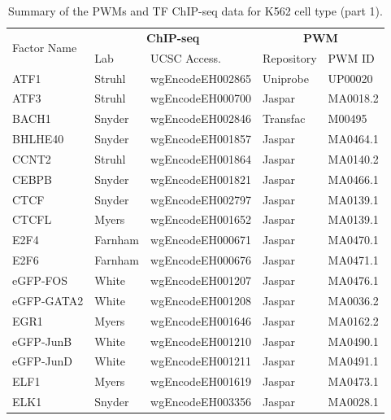 \documentclass{bioinfo}
\begin{document}
\begin{table}[t]
\begin{center}
\caption{Summary of the PWMs and TF ChIP-seq data for K562 cell type (part 1).}
\label{tab:datapwm.k562.1}
    \renewcommand{\arraystretch}{1.2}
    \begin{tabular}{ l|ll|ll }
        \hline
        \multirow{2}{*}{Factor Name} & \multicolumn{2}{c|}{\textbf{ChIP-seq}} & \multicolumn{2}{c}{\textbf{PWM}} \\
                & Lab     & UCSC Access.     & Repository & PWM ID \\
        \hline
        ATF1    & Struhl  & wgEncodeEH002865 & Uniprobe   & UP00020  \\
        ATF3    & Struhl  & wgEncodeEH000700 & Jaspar     & MA0018.2 \\
        BACH1   & Snyder  & wgEncodeEH002846 & Transfac   & M00495   \\
        BHLHE40 & Snyder  & wgEncodeEH001857 & Jaspar     & MA0464.1 \\
        CCNT2   & Struhl  & wgEncodeEH001864 & Jaspar     & MA0140.2 \\
        CEBPB   & Snyder  & wgEncodeEH001821 & Jaspar     & MA0466.1 \\
        CTCF    & Snyder  & wgEncodeEH002797 & Jaspar     & MA0139.1 \\
        CTCFL   & Myers   & wgEncodeEH001652 & Jaspar     & MA0139.1 \\
        E2F4    & Farnham & wgEncodeEH000671 & Jaspar     & MA0470.1 \\
        E2F6    & Farnham & wgEncodeEH000676 & Jaspar     & MA0471.1 \\
        eGFP-FOS    & White   & wgEncodeEH001207 & Jaspar     & MA0476.1 \\
        eGFP-GATA2   & White   & wgEncodeEH001208 & Jaspar     & MA0036.2 \\
        EGR1    & Myers   & wgEncodeEH001646 & Jaspar     & MA0162.2 \\
        eGFP-JunB   & White   & wgEncodeEH001210 & Jaspar     & MA0490.1 \\
        eGFP-JunD   & White   & wgEncodeEH001211 & Jaspar     & MA0491.1 \\
        ELF1    & Myers   & wgEncodeEH001619 & Jaspar     & MA0473.1 \\
        ELK1    & Snyder  & wgEncodeEH003356 & Jaspar     & MA0028.1 \\

\end{tabular}
\end{center}
\end{table}
\end{document}
